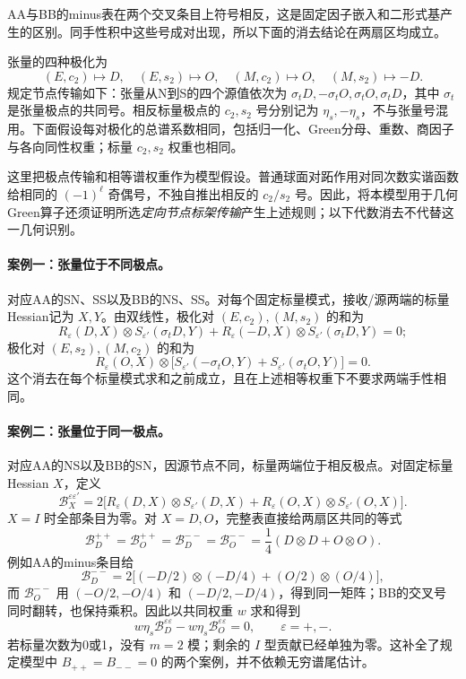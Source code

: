 \documentclass[UTF8,a4paper,11pt,fontset=fandol]{ctexart}
\numberwithin{equation}{section}
\theoremstyle{definition}
\begin{document}
AA与BB的minus表在两个交叉条目上符号相反，这是固定因子嵌入和二形式基产生的区别。同手性积中这些号成对出现，所以下面的消去结论在两扇区均成立。

张量的四种极化为
\[
(E,c_2)\mapsto D,\quad(E,s_2)\mapsto O,\quad
(M,c_2)\mapsto O,\quad(M,s_2)\mapsto-D.
\]
规定节点传输如下：张量从N到S的四个源值依次为
$\sigma_tD,-\sigma_tO,\sigma_tO,\sigma_tD$，其中 $\sigma_t$ 是张量极点的共同号。相反标量极点的 $c_2,s_2$ 号分别记为 $\eta_s,-\eta_s$，不与张量号混用。下面假设每对极化的总谱系数相同，包括归一化、Green分母、重数、商因子与各向同性权重；标量 $c_2,s_2$ 权重也相同。

这里把极点传输和相等谱权重作为模型假设。普通球面对跖作用对同次数实谐函数给相同的 $(-1)^\ell$ 奇偶号，不独自推出相反的 $c_2/s_2$ 号。因此，将本模型用于几何Green算子还须证明所选\emph{定向节点标架传输}产生上述规则；以下代数消去不代替这一几何识别。

\paragraph{案例一：张量位于不同极点。}
对应AA的SN、SS以及BB的NS、SS。对每个固定标量模式，接收/源两端的标量Hessian记为 $X,Y$。由双线性，极化对 $(E,c_2),(M,s_2)$ 的和为
\[
R_\varepsilon(D,X)\otimes S_{\varepsilon'}(\sigma_tD,Y)
+R_\varepsilon(-D,X)\otimes S_{\varepsilon'}(\sigma_tD,Y)=0;
\]
极化对 $(E,s_2),(M,c_2)$ 的和为
\[
R_\varepsilon(O,X)\otimes
\bigl[S_{\varepsilon'}(-\sigma_tO,Y)+S_{\varepsilon'}(\sigma_tO,Y)\bigr]=0.
\]
这个消去在每个标量模式求和之前成立，且在上述相等权重下不要求两端手性相同。

\paragraph{案例二：张量位于同一极点。}
对应AA的NS以及BB的SN，因源节点不同，标量两端位于相反极点。对固定标量Hessian $X$，定义
\[
\mathcal B_X^{\varepsilon\varepsilon'}=
2\bigl[R_\varepsilon(D,X)\otimes S_{\varepsilon'}(D,X)
+R_\varepsilon(O,X)\otimes S_{\varepsilon'}(O,X)\bigr].
\]
$X=I$ 时全部条目为零。对 $X=D,O$，完整表直接给两扇区共同的等式
\begin{equation}\label{eq:samechiralityblocks}
\mathcal B_D^{++}=\mathcal B_O^{++}
=\mathcal B_D^{--}=\mathcal B_O^{--}
=\frac14(D\otimes D+O\otimes O).
\end{equation}
例如AA的minus条目给
\[
\mathcal B_D^{--}=2\bigl[(-D/2)\otimes(-D/4)
+(O/2)\otimes(O/4)\bigr],
\]
而 $\mathcal B_O^{--}$ 用 $(-O/2,-O/4)$ 和 $(-D/2,-D/4)$，得到同一矩阵；BB的交叉号同时翻转，也保持乘积。因此以共同权重 $w$ 求和得到
\[
w\eta_s\mathcal B_D^{\varepsilon\varepsilon}
-w\eta_s\mathcal B_O^{\varepsilon\varepsilon}=0,
\qquad\varepsilon=+,-.
\]
若标量次数为0或1，没有 $m=2$ 模；剩余的 $I$ 型贡献已经单独为零。这补全了规定模型中 $B_{++}=B_{--}=0$ 的两个案例，并不依赖无穷谱尾估计。
\end{document}
